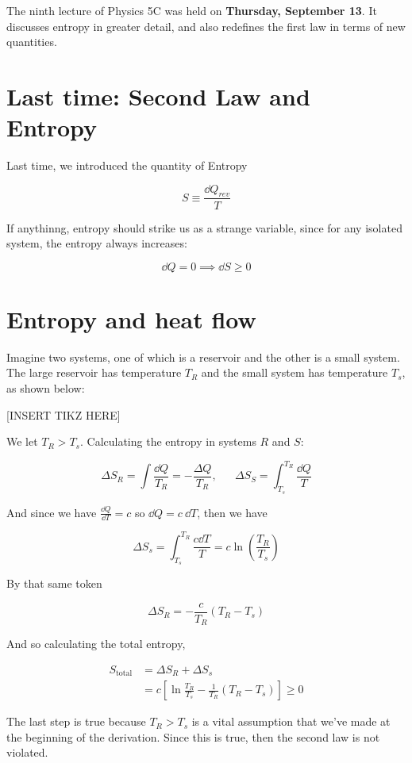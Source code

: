 The ninth lecture of Physics 5C was held on  \textbf{Thursday, September 13}. It discusses entropy in greater detail, and also redefines the first law in terms of new quantities. 

\section{Last time: Second Law and Entropy} 

Last time, we introduced the quantity of Entropy

\[ S \equiv \frac{\dd Q_{rev}}{T}\]

If anythinng, entropy should strike us as a strange variable, since for any isolated system, the entropy always increases: 

\[ \dd Q = 0 \implies \dd S \ge 0\]

\section{Entropy and heat flow} 

Imagine two systems, one of which is a reservoir and the other is a small system. The large reservoir has temperature $T_R$ and the small system has temperature $T_s$, as shown below: 

[INSERT TIKZ HERE]

We let $T_R > T_s$. Calculating the entropy in systems $R$ and $S$: 

\[ \Delta S_R = \int \frac{\dd Q}{T_R} = -\frac{\Delta Q}{T_R}, \phantom{aaa} \Delta S_S = \int_{T_s}^{T_R} \frac{\dd Q}{T}\]

And since we have $\frac{\dd Q}{\dd T} = c$ so $\dd Q = c \  \dd T$, then we have 

\[ \Delta S_s = \int_{T_s}^{T_R} \frac{c\dd T}{T} = c\ln \left(\frac{T_R}{T_s}\right)\]

By that same token 

\[ \Delta S_R = -\frac{c}{T_R}(T_R - T_s)\]

And so calculating the total entropy, 

\begin{align*}
    S_{\text{total}} &= \Delta S_R + \Delta S_s\\
    &= c\left[\ln \frac{T_R}{T_s} - \frac{1}{T_R}(T_R - T_s)\right] \ge 0
\end{align*}

The last step is true because $T_R > T_s$ is a vital assumption that we've made at the beginning of the derivation. Since this is true, then the second law is not violated. 

